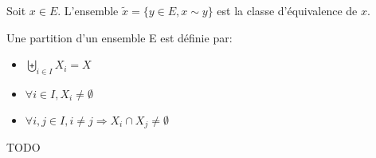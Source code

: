 \begin{definition}
    Soit $x \in E$.
    L'ensemble $\tilde{x} = \{y \in E, x \sim y\}$ est la classe d'équivalence de $x$.
\end{definition}

\begin{definition}[partition]
    Une partition d'un ensemble E est définie par:
    \begin{itemize}
        \item $\biguplus_{i \in I} X_{i} = X$
        \item $\forall i \in I, X_{i} \neq \emptyset$
        \item $\forall i,j \in I, i \neq j \Rightarrow X_{i} \cap X_{j} \neq \emptyset$
    \end{itemize}
\end{definition}

\begin{definition}
    TODO
\end{definition}